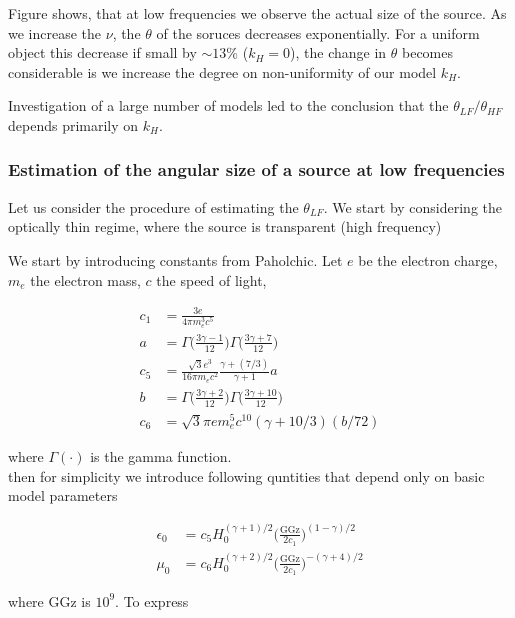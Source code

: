 \documentclass[11pt,a4paper,headinclude=true,DIV=14,BCOR=8mm,chapterprefix,listof=totoc,twoside,openright,abstracton]{scrbook}
\begin{document}
Figure shows, that at low frequencies we observe the actual size of the source. As we increase the $\nu$, the $\theta$ of the soruces decreases exponentially. For a uniform object this decrease if small by $\sim 13\%$ ($k_H=0$), the change in $\theta$ becomes considerable is we increase the degree on non-uniformity of our model $k_H$. 

Investigation of a large number of models led to the conclusion that the $\theta_{LF}/\theta_{HF}$ depends primarily on $k_H$. 

\subsubsection{Estimation of the angular size of a source at low frequencies}

Let us consider the procedure of estimating the $\theta_{LF}$. We start by considering the optically thin regime, where the source is transparent (high frequency)

We start by introducing constants from Paholchic. Let $e$ be the electron charge, $m_e$ the electron mass, $c$ the speed of light,

\begin{align}
    c_1 &= \frac{3 e}{4 \pi m_e ^3 c^5} \\
    a &= \Gamma\Big(\frac{3 \gamma - 1}{12}\Big) \Gamma\Big(\frac{3\gamma + 7}{12}\Big) \\
    c_5 &= \frac{\sqrt{3}e^3}{16\pi m_e c^2}\frac{\gamma + (7/3)}{\gamma + 1} a \\
    b &= \Gamma\Big(\frac{3\gamma + 2}{12}\Big)\Gamma\Big(\frac{3\gamma + 10}{12}\Big) \\
    c_6 &= \sqrt{3}\pi e m_e ^5 c^{10} (\gamma + 10/3) (b / 72) 
\end{align}

where $\Gamma(\cdot)$ is the gamma function. \\
then for simplicity we introduce following quntities that depend only on basic model parameters

\begin{align}
    \epsilon_0 &= c_5 H_{0}^{(\gamma + 1)/2} \Big(\frac{\text{GGz}}{2 c_1}\Big)^{(1-\gamma)/2} \\
    \mu_0 &= c_6 H_0^{(\gamma + 2)/2} \Big(\frac{\text{GGz}}{2 c_1}\Big)^{-(\gamma+4)/2}
\end{align}

where GGz is $10^9$. To express 










\newpage


\end{document}
